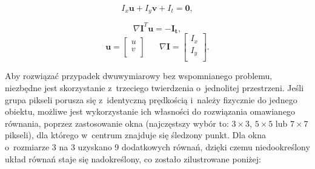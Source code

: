         \begin{equation}
          I_{x}\mathbf{u} + I_{y}\mathbf{v} + I_{t} = \mathbf{0},
        \end{equation}

        \begin{equation}
          \nabla \mathbf{I}^{T} \mathbf{u} = -\mathbf{I_{t}},
        \end{equation}
        \begin{equation}
          \mathbf{u} =
            \begin{bmatrix}
              u \\
              v \\
            \end{bmatrix}
          \hspace{20pt}
          \nabla \mathbf{I} =
            \begin{bmatrix}
              I_{x} \\
              I_{y} \\
            \end{bmatrix}.
        \end{equation}

      Aby rozwiązać przypadek dwuwymiarowy bez wspomnianego problemu, niezbędne jest skorzystanie z~trzeciego twierdzenia o~jednolitej przestrzeni. Jeśli grupa pikseli porusza się z~identyczną prędkością i~należy fizycznie do jednego obiektu, możliwe jest wykorzystanie ich własności do rozwiązania omawianego równania, poprzez zastosowanie okna (najczęstszy wybór to: $3\times3$, $5\times5$ lub $7\times7$ pikseli), dla którego w~centrum znajduje się śledzony punkt. Dla okna o~rozmiarze 3 na 3 uzyskano 9 dodatkowych równań, dzięki czemu niedookreślony układ równań staje się nadokreślony, co zostało zilustrowane poniżej:


